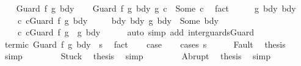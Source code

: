 \begin{isabellebody}
\isanewline
{}\isamarkupfalse%
\isanewline
\ \ \isamarkupfalse%
\ {\isacharparenleft}Guard\ f\ g{}\ bdy{}{\isacharparenright}\isanewline
\ \ \isamarkupfalse%
\ {\isachardoublequoteopen}{\isacharparenleft}Guard\ f\ g{}\ bdy{}\ {\isasyminter}\isactrlsub g\ c{}{\isacharparenright}\ {\isacharequal}\ Some\ c{\isachardoublequoteclose}\ \isamarkupfalse%
\ fact\isanewline
\ \ \isamarkupfalse%
\ \isamarkupfalse%
\ g{}\ bdy{}\ bdy\ \isanewline
\ \ \ \ c{}{\isacharcolon}\ {\isachardoublequoteopen}c{}{\isacharequal}Guard\ f\ g{}\ bdy{}{\isachardoublequoteclose}\ \isanewline
\ \ \ \ bdy{\isacharcolon}\ {\isachardoublequoteopen}{\isacharparenleft}bdy{}\ {\isasyminter}\isactrlsub g\ bdy{}{\isacharparenright}\ {\isacharequal}\ Some\ bdy{\isachardoublequoteclose}\ \isanewline
\ \ \ \ c{\isacharcolon}\ {\isachardoublequoteopen}c{\isacharequal}Guard\ f\ {\isacharparenleft}g{}\ {\isasyminter}\ g{}{\isacharparenright}\ bdy{\isachardoublequoteclose}\isanewline
\ \ \ \ \isamarkupfalse%
\ {\isacharparenleft}auto\ simp\ add{\isacharcolon}\ inter{\isacharunderscore}guards{\isacharunderscore}Guard{\isacharparenright}\isanewline
\ \ \isamarkupfalse%
\ termi{\isacharunderscore}c{}{\isacharcolon}\ {\isachardoublequoteopen}{\isasymGamma}{\isasymturnstile}Guard\ f\ g{}\ bdy{}\ {\isasymdown}\ s{\isachardoublequoteclose}\ \isamarkupfalse%
\ fact\isanewline
\ \ \isamarkupfalse%
\ {\isacharquery}case\isanewline
\ \ \isamarkupfalse%
\ {\isacharparenleft}cases\ s{\isacharparenright}\isanewline
\ \ \ \ \isamarkupfalse%
\ Fault\ \isamarkupfalse%
\ {\isacharquery}thesis\ \isamarkupfalse%
\ simp\isanewline
\ \ \isamarkupfalse%
\isanewline
\ \ \ \ \isamarkupfalse%
\ Stuck\ \isamarkupfalse%
\ {\isacharquery}thesis\ \isamarkupfalse%
\ simp\isanewline
\ \ \isamarkupfalse%
\isanewline
\ \ \ \ \isamarkupfalse%
\ Abrupt\ \isamarkupfalse%
\ {\isacharquery}thesis\ \isamarkupfalse%
\ simp\isanewline
\ \ \isamarkupfalse%
\isanewline
\ \ \ \ \isamarkupfalse%

\end{isabellebody}
